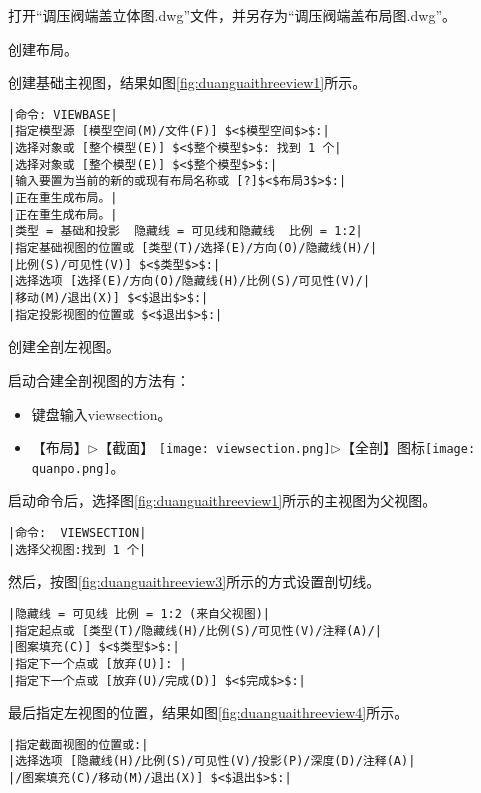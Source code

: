 
\begin{procedure}
\item 打开“调压阀端盖立体图.dwg”文件，并另存为“调压阀端盖布局图.dwg”。
\item 创建布局。
\item 创建基础主视图，结果如图\ref{fig:duanguaithreeview1}所示。
\begin{lstlisting}
|命令: VIEWBASE|
|指定模型源 [模型空间(M)/文件(F)] $<$模型空间$>$:|
|选择对象或 [整个模型(E)] $<$整个模型$>$: 找到 1 个|
|选择对象或 [整个模型(E)] $<$整个模型$>$:|
|输入要置为当前的新的或现有布局名称或 [?]$<$布局3$>$:|
|正在重生成布局。|
|正在重生成布局。|
|类型 = 基础和投影  隐藏线 = 可见线和隐藏线  比例 = 1:2|
|指定基础视图的位置或 [类型(T)/选择(E)/方向(O)/隐藏线(H)/|
|比例(S)/可见性(V)] $<$类型$>$:|
|选择选项 [选择(E)/方向(O)/隐藏线(H)/比例(S)/可见性(V)/|
|移动(M)/退出(X)] $<$退出$>$:|
|指定投影视图的位置或 $<$退出$>$:|
\end{lstlisting}
\begin{figure}[htbp]
\centering
\begin{floatrow}[3]
\end{floatrow}
\end{figure}
\item 创建全剖左视图。

启动合建全剖视图的方法有：
\begin{itemize}
\item 键盘输入viewsection。
\item 【布局】$\triangleright$【截面】
\texttt{[image: viewsection.png]}$\triangleright$【全剖】图标\texttt{[image: quanpo.png]}。
\end{itemize}
启动命令后，选择图\ref{fig:duanguaithreeview1}所示的主视图为父视图。
\begin{lstlisting}
|命令:  VIEWSECTION|
|选择父视图:找到 1 个|
\end{lstlisting}

然后，按图\ref{fig:duanguaithreeview3}所示的方式设置剖切线。
\begin{lstlisting}
|隐藏线 = 可见线 比例 = 1:2 (来自父视图)|
|指定起点或 [类型(T)/隐藏线(H)/比例(S)/可见性(V)/注释(A)/|
|图案填充(C)] $<$类型$>$:|
|指定下一个点或 [放弃(U)]: |
|指定下一个点或 [放弃(U)/完成(D)] $<$完成$>$:|
\end{lstlisting}
最后指定左视图的位置，结果如图\ref{fig:duanguaithreeview4}所示。
\begin{lstlisting}
|指定截面视图的位置或:|
|选择选项 [隐藏线(H)/比例(S)/可见性(V)/投影(P)/深度(D)/注释(A)|
|/图案填充(C)/移动(M)/退出(X)] $<$退出$>$:|
\end{lstlisting}
\end{procedure}
\endinput
